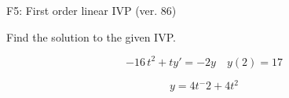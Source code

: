 \begin{exercise}
  \begin{exerciseTitle}F5: First order linear IVP (ver. 86)\end{exerciseTitle}
  \begin{exerciseStatement}
    
Find the solution to the given IVP.

    
\[-16 \, t^{2} +ty'= -2 y \hspace{1em} y( 2 ) = 17\]

  \end{exerciseStatement}
  \begin{exerciseAnswer}
    
\[y= 4 t^ -2 +4 t^{2}\]

  \end{exerciseAnswer}
\end{exercise}